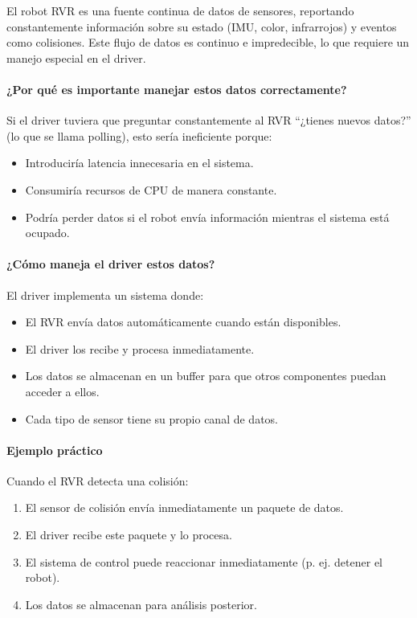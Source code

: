 \documentclass[11pt]{article}
\numberwithin{figure}{section}
\numberwithin{table}{section}
\begin{document}
El robot RVR es una fuente continua de datos de sensores, reportando constantemente información sobre su estado (IMU, color, infrarrojos) y eventos como colisiones. Este flujo de datos es continuo e impredecible, lo que requiere un manejo especial en el driver.

\paragraph{¿Por qué es importante manejar estos datos correctamente?}
Si el driver tuviera que preguntar constantemente al RVR ``¿tienes nuevos datos?'' (lo que se llama polling), esto sería ineficiente porque:
\begin{itemize}
    \item Introduciría latencia innecesaria en el sistema.
    \item Consumiría recursos de CPU de manera constante.
    \item Podría perder datos si el robot envía información mientras el sistema está ocupado.
\end{itemize}

\paragraph{¿Cómo maneja el driver estos datos?}
El driver implementa un sistema donde:
\begin{itemize}
    \item El RVR envía datos automáticamente cuando están disponibles.
    \item El driver los recibe y procesa inmediatamente.
    \item Los datos se almacenan en un buffer para que otros componentes puedan acceder a ellos.
    \item Cada tipo de sensor tiene su propio canal de datos.
\end{itemize}

\paragraph{Ejemplo práctico}
Cuando el RVR detecta una colisión:
\begin{enumerate}
    \item El sensor de colisión envía inmediatamente un paquete de datos.
    \item El driver recibe este paquete y lo procesa.
    \item El sistema de control puede reaccionar inmediatamente (p. ej. detener el robot).
    \item Los datos se almacenan para análisis posterior.
\end{enumerate}
\end{document}
